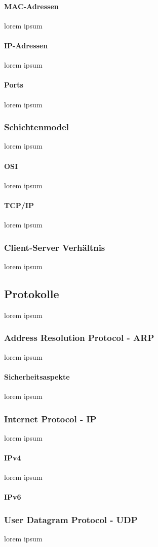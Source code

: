 \documentclass[12pt,a4paper]{report}
\begin{document}
\paragraph{MAC-Adressen}
lorem ipsum
\paragraph{IP-Adressen}
lorem ipsum
\paragraph{Ports}
lorem ipsum
\subsubsection{Schichtenmodel}
lorem ipsum
\paragraph{OSI}
lorem ipsum
\paragraph{TCP/IP}
lorem ipsum
\subsubsection{Client-Server Verhältnis}
lorem ipsum
\subsection{Protokolle}
lorem ipsum
\subsubsection{Address Resolution Protocol - ARP}
lorem ipsum
\paragraph{Sicherheitsaspekte}
lorem ipsum
\subsubsection{Internet Protocol - IP}
lorem ipsum
\paragraph{IPv4}
lorem ipsum
\paragraph{IPv6}
\subsubsection{User Datagram Protocol - UDP}
lorem ipsum
\end{document}
